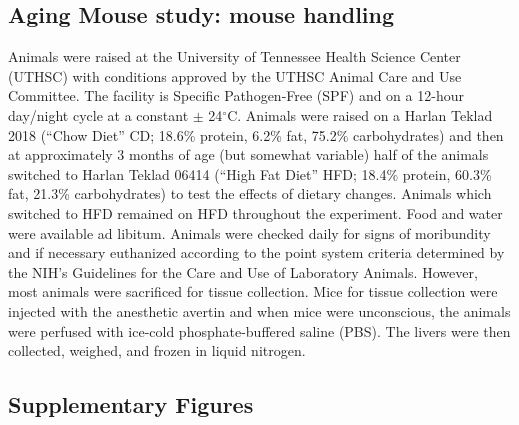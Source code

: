 \documentclass[num-refs]{wiley-article}
\begin{document}
\subsection{Aging Mouse study: mouse handling}
Animals were raised at the University of Tennessee Health Science Center (UTHSC) with conditions approved by the UTHSC Animal Care and Use Committee. The facility is Specific Pathogen-Free (SPF) and on a 12-hour day/night cycle at a constant $\pm$ 24$^{\circ}$C. Animals were raised on a Harlan Teklad 2018 (“Chow Diet” CD; 18.6\% protein, 6.2\% fat, 75.2\% carbohydrates) and then at approximately 3 months of age (but somewhat variable) half of the animals switched to Harlan Teklad 06414 (“High Fat Diet” HFD; 18.4\% protein, 60.3\% fat, 21.3\% carbohydrates) to test the effects of dietary changes. Animals which switched to HFD remained on HFD throughout the experiment. Food and water were available ad libitum. Animals were checked daily for signs of moribundity and if necessary euthanized according to the point system criteria determined by the NIH’s Guidelines for the Care and Use of Laboratory Animals. However, most animals were sacrificed for tissue collection. Mice for tissue collection were injected with the anesthetic avertin and when mice were unconscious, the animals were perfused with ice-cold phosphate-buffered saline (PBS). The livers were then collected, weighed, and frozen in liquid nitrogen.

\subsection{Supplementary Figures}
\end{document}
